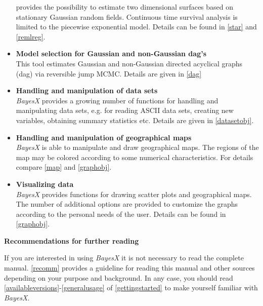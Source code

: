 \begin{itemize}
provides the possibility to estimate two dimensional surfaces
based on stationary Gaussian random fields. Continuous time
survival analysis is limited to the piecewise exponential model.
Details can be found in \autoref{star} and \autoref{remlreg}.
\item {\bf Model selection for Gaussian and non-Gaussian dag's} \\
This tool estimates Gaussian and non-Gaussian directed acyclical
graphs (dag) via reversible jump MCMC. Details are given in
\autoref{dag}
\item {\bf Handling and manipulation of data sets} \\
{\em BayesX} provides a growing number of functions for handling
and manipulating data sets, e.g. for reading ASCII data sets,
creating new variables, obtaining summary statistics etc. Details
are given in \autoref{datasetobj}.
\item {\bf Handling and manipulation of geographical maps} \\
{\em BayesX} is able to manipulate and draw geographical maps. The
regions of the map may be colored according to some numerical
characteristics. For details compare \autoref{map} and
\autoref{graphobj}.
\item {\bf Visualizing data} \\
{\em BayesX} provides functions for drawing scatter plots and
geographical maps. The number of additional options are provided
to customize the graphs according to the personal needs of the
user. Details can be found in \autoref{graphobj}.
\end{itemize}

\vspace{0.5cm} {\bf Recommendations for further reading}

\vspace{0.2cm} If you are interested in using {\em BayesX} it is
not necessary to read the complete manual. \autoref{recomm}
provides a guideline for reading this manual and other sources
depending on your purpose and background. In any case, you should
read \autoref{availableversions}-\autoref{generalusage} of
\autoref{gettingstarted} to make yourself familiar with {\em
BayesX}.



